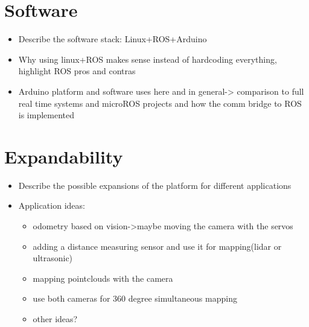 \section{Software}
\pagestyle{scrheadings}

\begin{itemize}
 \item Describe the software stack: Linux+ROS+Arduino
 \item Why using linux+ROS makes sense instead of hardcoding everything, highlight ROS pros and contras
 \item Arduino platform and software uses here and in general-> comparison to full real time systems and microROS projects and how the comm bridge to ROS is implemented
\end{itemize}

\section{Expandability}
\pagestyle{scrheadings}

\begin{itemize}
 \item Describe the possible expansions of the platform for different applications
 \item Application ideas: 
 \begin{itemize}
 \item odometry based on vision->maybe moving the camera with the servos
 \item adding a distance measuring sensor and use it for mapping(lidar or ultrasonic)
 \item mapping pointclouds with the camera
 \item use both cameras for 360 degree simultaneous mapping
 \item other ideas?
 \end{itemize}
\end{itemize}



